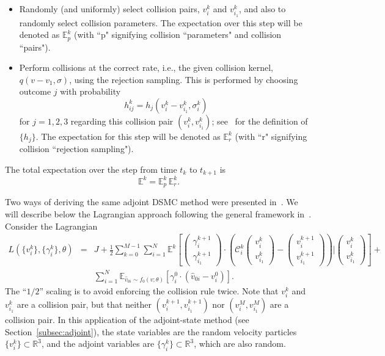 \documentclass[12pt]{amsart}
\newcommand{\bbR}{\mathbb R} \newcommand{\bbS}{\mathbb S}
\newcommand{\cC}{\mathcal C} \newcommand{\cD}{\mathcal D}
\begin{document}
\begin{itemize}
    \item[Step 1. ] Randomly (and uniformly) select collision pairs, $v_i^k$ and $v_{i_1}^k$, and also to randomly select collision parameters. The expectation over this step will be denoted as $\mathbb{E}_p^k$ (with ``p" signifying collision ``parameters" and collision ``pairs"). 
    \item[Step 2. ] Perform collisions at the correct rate, i.e., the given collision kernel, $q(v -v_1, \sigma)$, using the rejection sampling. This is performed by choosing outcome $j$ with probability \begin{equation}\label{eq:rejection_hij}
        h^k_{ij}=h_j (v^k_i -v^k_{i_1}, \sigma_i^k)
    \end{equation} 
    for $j=1,2,3$ regarding this collision pair $(v_i^k, v_{i_1}^k)$; see~ for the definition of $\{h_j\}$. The expectation for this step will be denoted as $\mathbb{E}_r^k$ (with ``r" signifying collision ``rejection sampling"). 
\end{itemize}
The total expectation over the step from time $t_k$ to $t_{k+1}$ is
\begin{equation*}%
\mathbb{E}^k = \mathbb{E}_p^k \, \mathbb{E}_r^k  .
\end{equation*}


Two ways of deriving the same adjoint DSMC method were presented in~\cite{yang2023adjoint}. We will  describe below the Lagrangian approach following the general framework in~.
Consider the Lagrangian
\begin{eqnarray}
 L\left(\{v_i^k\},\{\gamma_i^k\},\theta \right) &= &  J + \frac{1}{2}\sum_{k=0}^{M-1} \sum_{i=1}^N \mathbb{E}^k \left[   \begin{pmatrix} \gamma_i^{k+1} \\ \gamma_{i_1}^{k+1} \end{pmatrix} \cdot  \left( \cC_{i}^k \begin{pmatrix} v_i^k \\ v_{i_1}^k \end{pmatrix} - \begin{pmatrix} v_i^{k+1} \\ v_{i_1}^{k+1} \end{pmatrix} \right)   \bigg| \begin{pmatrix} v_i^k \\ v_{i_1}^k \end{pmatrix} \right] +  \nonumber \\
&&   \sum_{i=1}^N \mathbb{E}_{\hat{v}_{0i} \sim f_0(v;\theta)} \left[  \gamma_{i}^0 \cdot  \left( \hat{v}_{0i} - v_i^0 \right) \right]. \label{eq:full_Lag}
\end{eqnarray}
The ``$1/2$'' scaling is to avoid enforcing the collision rule twice. Note that $v_i^{k}$ and $v_{i_1}^{k}$ are a collision pair, but that neither $(v_i^{k+1}, v_{i_1}^{k+1})$ nor $(v_i^{M}, v_{i_1}^{M})$  are a collision pair. In this application of the adjoint-state method (see Section~\ref{subsec:adjoint}), the state variables are the random velocity particles $\{v_i^{k}\} \subset \bbR^3$, and the adjoint variables are $\{\gamma_i^{k}\}\subset \bbR^3$, which are also random. 
\end{document}
